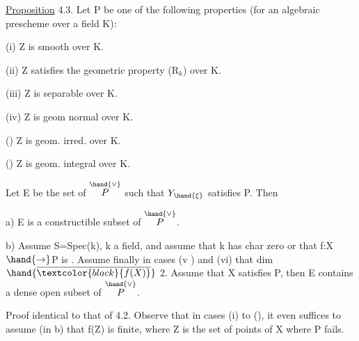 
\uline{Proposition} 4.3. Let P be one of the following properties (for an
algebraic prescheme over a field K):

(i) Z  is smooth over K.

(ii) Z satisfies the geometric property (R$_k$) over K.

(iii) Z is separable over K.

(iv) Z is geom normal over K.

() Z is geom. irred. over K.

() Z is geom. integral over K.

Let E be the set of \hand{$\xi \in$} $\overset{\hand{\vee}}{P}$ such that $Y_{\hand{\xi}}$ satisfies P. Then

a) E is a constructible subset of $\overset{\hand{\vee}}{P}$.

b) Assume  S=Spec(k), k a field, and assume  that k has
char zero or that f:X$\hand{\rightarrow}$P is . Assume finally in
cases (v ) and (vi) that dim $\hand{\overline{\textcolor{black}{f(X)}}}$  2. Assume that X satisfies P,
then E contains a  dense open subset of $\overset{\hand{\vee}}{P}$.

Proof identical to that of 4.2. Observe that in
cases (i) to (), it even suffices to assume (in b) that f(Z) is
finite, where Z is the set of points of X where  P fails.


